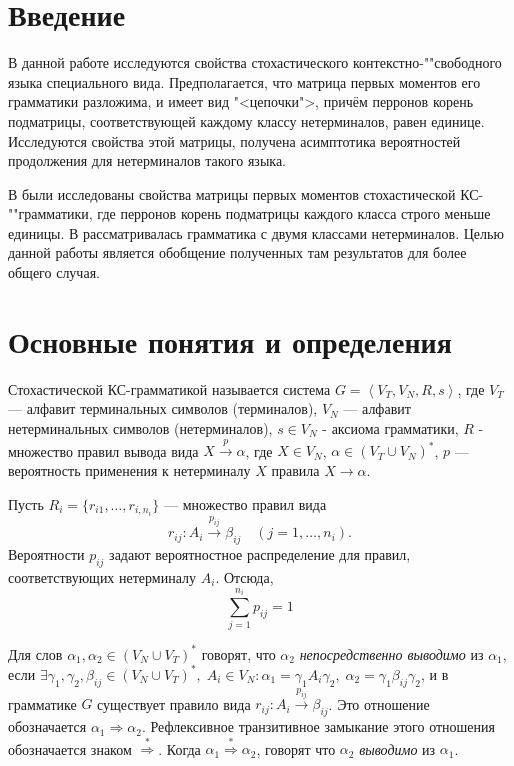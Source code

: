 \documentclass[12pt]{article}
\begin{document}
\setlength{\parindent}{0pt}
\setlength{\parskip}{8pt}

\tableofcontents
\newpage

\section*{Введение}

В данной работе исследуются свойства стохастического контекстно-""свободного языка специального вида. Предполагается, что матрица первых моментов его грамматики разложима, и имеет вид "<цепочки">, причём перронов корень подматрицы, соответствующей каждому классу нетерминалов, равен единице. Исследуются свойства этой матрицы, получена асимптотика вероятностей продолжения для нетерминалов такого языка.

В \cite{lit:zhil_om} были исследованы свойства матрицы первых моментов стохастической КС-""грамматики, где перронов корень подматрицы каждого класса строго меньше единицы. В \cite{lit:borisov_2gr} рассматривалась грамматика с двумя классами нетерминалов. Целью данной работы является обобщение полученных там результатов для более общего случая.

\section{Основные понятия и определения}

Стохастической КС-грамматикой называется система $G = \left< V_T, V_N, R, s \right>$, где $V_T$ --- алфавит терминальных символов (терминалов), $V_N$ --- алфавит нетерминальных символов (нетерминалов), $s \in V_N$ - аксиома грамматики, $R$ - множество правил вывода вида $X \xrightarrow{p} \alpha$, где $X \in V_N$, $\alpha \in (V_T \cup V_N)^*$, $p$ --- вероятность применения к нетерминалу $X$ правила $X \rightarrow \alpha$.

Пусть $R_i = \lbrace r_{i1},\ldots,r_{i,n_i} \rbrace$ --- множество правил вида
\begin{equation*}
	r_{ij} : A_i \xrightarrow{p_{ij}} \beta_{ij}\quad (j=1,\ldots,n_i).
\end{equation*}
Вероятности $p_{ij}$ задают вероятностное распределение для правил, соответствующих нетерминалу $A_i$. Отсюда,
\begin{equation}
\label{eq:sum_p_eq_1}
	\sum\limits_{j=1}^{n_i} p_{ij} = 1
\end{equation}	

Для слов $\alpha_1, \alpha_2 \in (V_N \cup V_T)^*$ говорят, что $\alpha_2$ \emph{непосредственно выводимо} из $\alpha_1$, если $\exists \gamma_1, \gamma_2, \beta_{ij} \in (V_N \cup V_T)^*,\; A_i \in V_N : \alpha_1 = \gamma_1 A_i \gamma_2,\; \alpha_2 = \gamma_1 \beta_{ij} \gamma_2$, и в грамматике $G$ существует правило вида $r_{ij} : A_i \stackrel{p_{ij}}{\rightarrow} \beta_{ij}$. Это отношение обозначается $\alpha_1 \Rightarrow \alpha_2$. Рефлексивное транзитивное замыкание этого отношения обозначается знаком $\stackrel{*}{\Rightarrow}$. Когда $\alpha_1 \stackrel{*}{\Rightarrow} \alpha_2$, говорят что $\alpha_2$ \emph{выводимо} из $\alpha_1$.
\end{document}
